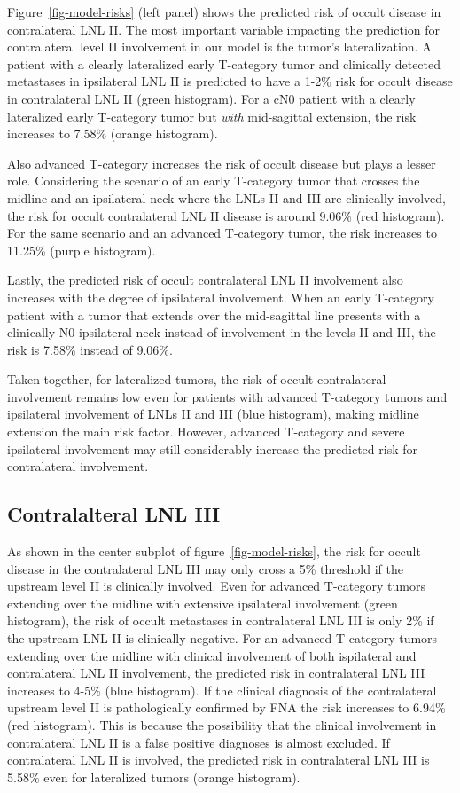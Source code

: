 \documentclass[
  sn-mathphys-num,
]{sn-jnl}
\begin{document}
Figure~\ref{fig-model-risks} (left panel) shows the predicted risk of
occult disease in contralateral LNL II. The most important variable
impacting the prediction for contralateral level II involvement in our
model is the tumor's lateralization. A patient with a clearly
lateralized early T-category tumor and clinically detected metastases in
ipsilateral LNL II is predicted to have a 1-2\% risk for occult disease
in contralateral LNL II (green histogram). For a cN0 patient with a
clearly lateralized early T-category tumor but \emph{with} mid-sagittal
extension, the risk increases to 7.58\% (orange histogram).

Also advanced T-category increases the risk of occult disease but plays
a lesser role. Considering the scenario of an early T-category tumor
that crosses the midline and an ipsilateral neck where the LNLs II and
III are clinically involved, the risk for occult contralateral LNL II
disease is around 9.06\% (red histogram). For the same scenario and an
advanced T-category tumor, the risk increases to 11.25\% (purple
histogram).

Lastly, the predicted risk of occult contralateral LNL II involvement
also increases with the degree of ipsilateral involvement. When an early
T-category patient with a tumor that extends over the mid-sagittal line
presents with a clinically N0 ipsilateral neck instead of involvement in
the levels II and III, the risk is 7.58\% instead of 9.06\%.

Taken together, for lateralized tumors, the risk of occult contralateral
involvement remains low even for patients with advanced T-category
tumors and ipsilateral involvement of LNLs II and III (blue histogram),
making midline extension the main risk factor. However, advanced
T-category and severe ipsilateral involvement may still considerably
increase the predicted risk for contralateral involvement.

\subsection{Contralalteral LNL III}\label{contralalteral-lnl-iii}

As shown in the center subplot of figure~\ref{fig-model-risks}, the risk
for occult disease in the contralateral LNL III may only cross a 5\%
threshold if the upstream level II is clinically involved. Even for
advanced T-category tumors extending over the midline with extensive
ipsilateral involvement (green histogram), the risk of occult metastases
in contralateral LNL III is only 2\% if the upstream LNL II is
clinically negative. For an advanced T-category tumors extending over
the midline with clinical involvement of both ispilateral and
contralateral LNL II involvement, the predicted risk in contralateral
LNL III increases to 4-5\% (blue histogram). If the clinical diagnosis
of the contralateral upstream level II is pathologically confirmed by
FNA the risk increases to 6.94\% (red histogram). This is because the
possibility that the clinical involvement in contralateral LNL II is a
false positive diagnoses is almost excluded. If contralateral LNL II is
involved, the predicted risk in contralateral LNL III is 5.58\% even for
lateralized tumors (orange histogram).
\end{document}
